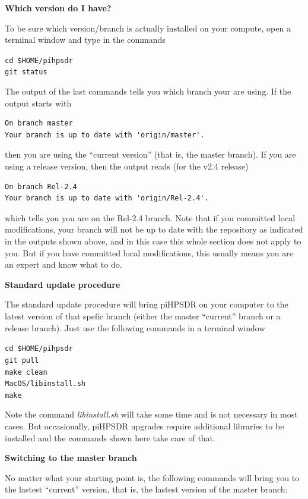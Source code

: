 \documentclass[12pt]{book}
\def\grtt#1{\texttt{\color{magenta}#1}}
\def\pH{pi\-HPSDR\xspace}
\begin{document}
\medskip
\textbf{Which version do I have?}

To be sure which version/branch is actually installed on your compute, open a terminal  window and
type in the commands

\grtt{cd \$HOME/pihpsdr} \\
\grtt{git status}

The output of the last commands tells you which branch your are using. If the output starts
with

\begin{verbatim}
On branch master
Your branch is up to date with 'origin/master'.
\end{verbatim}

then you are using the ``current version'' (that is, the master branch). If you are using a release
version, then the output reads (for the v2.4 release)

\begin{verbatim}
On branch Rel-2.4
Your branch is up to date with 'origin/Rel-2.4'.
\end{verbatim}

which tells you you are on the Rel-2.4 branch. Note that if you committed local modifications,
your branch will not be up to date with the repository as indicated in the outputs shown above,
and in this case this whole section does  not apply  to you. But if you have committed  local
modifications, this usually means you are an expert and know what to do.

\medskip
\textbf{Standard update procedure}

The standard update procedure will bring \pH on your computer to the latest version of
that spefic branch (either the master ``current'' branch or a release branch).
Just use the following commands in a terminal window

\grtt{cd \$HOME/pihpsdr} \\
\grtt{git pull} \\
\grtt{make clean} \\
\grtt{MacOS/libinstall.sh} \\
\grtt{make}

Note the command \textit{libinstall.sh} will take some time and is not necessary in most cases. But occasionally,
\pH upgrades require additional libraries to be installed and the commands shown here take care of that.

\medskip
\textbf{Switching to the master branch}

No matter what your starting point is, the following commands will bring you to the
lastest ``current'' version, that is, the lastest version of the master branch:
\end{document}
